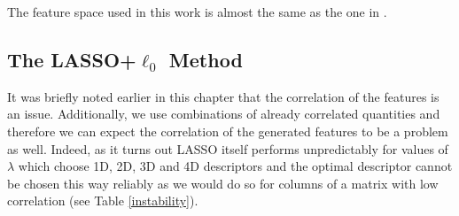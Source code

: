 \documentclass[11pt,oneside,czech,american]{book} %
\theoremstyle{definition} %
\theoremstyle{definition}
\begin{document}
The feature space used in this work is almost the same as the one in \parencite{ghiringhelli17}.

\subsection{The LASSO+$\ell_{0}$ Method}
It was briefly noted earlier in this chapter that the correlation of the features is an issue. Additionally, we use combinations of already correlated quantities and therefore we can expect the correlation of the generated features to be a problem as well. Indeed, as it turns out LASSO itself performs unpredictably for values of $\lambda$ which choose 1D, 2D, 3D and 4D descriptors and the optimal descriptor cannot be chosen this way reliably as we would do so for columns of a matrix with low correlation (see Table \ref{instability}).
\end{document}
